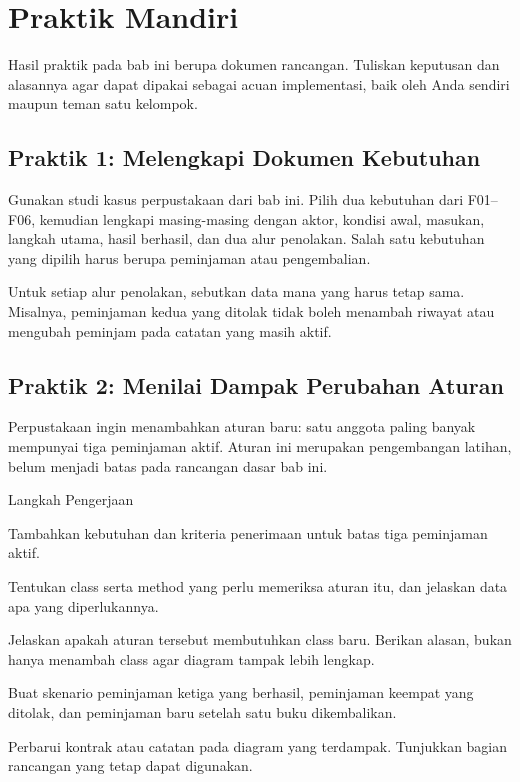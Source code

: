 \section{Praktik Mandiri}

Hasil praktik pada bab ini berupa dokumen rancangan. Tuliskan keputusan dan alasannya agar dapat dipakai sebagai acuan implementasi, baik oleh Anda sendiri maupun teman satu kelompok.

\subsection{Praktik 1: Melengkapi Dokumen Kebutuhan}

Gunakan studi kasus perpustakaan dari bab ini. Pilih dua kebutuhan dari F01--F06, kemudian lengkapi masing-masing dengan aktor, kondisi awal, masukan, langkah utama, hasil berhasil, dan dua alur penolakan. Salah satu kebutuhan yang dipilih harus berupa peminjaman atau pengembalian.

Untuk setiap alur penolakan, sebutkan data mana yang harus tetap sama. Misalnya, peminjaman kedua yang ditolak tidak boleh menambah riwayat atau mengubah peminjam pada catatan yang masih aktif.

\subsection{Praktik 2: Menilai Dampak Perubahan Aturan}

Perpustakaan ingin menambahkan aturan baru: satu anggota paling banyak mempunyai tiga peminjaman aktif. Aturan ini merupakan pengembangan latihan, belum menjadi batas pada rancangan dasar bab ini.

\begin{langkah}{Langkah Pengerjaan}
  \item Tambahkan kebutuhan dan kriteria penerimaan untuk batas tiga peminjaman aktif.
  \item Tentukan class serta method yang perlu memeriksa aturan itu, dan jelaskan data apa yang diperlukannya.
  \item Jelaskan apakah aturan tersebut membutuhkan class baru. Berikan alasan, bukan hanya menambah class agar diagram tampak lebih lengkap.
  \item Buat skenario peminjaman ketiga yang berhasil, peminjaman keempat yang ditolak, dan peminjaman baru setelah satu buku dikembalikan.
  \item Perbarui kontrak atau catatan pada diagram yang terdampak. Tunjukkan bagian rancangan yang tetap dapat digunakan.
\end{langkah}

